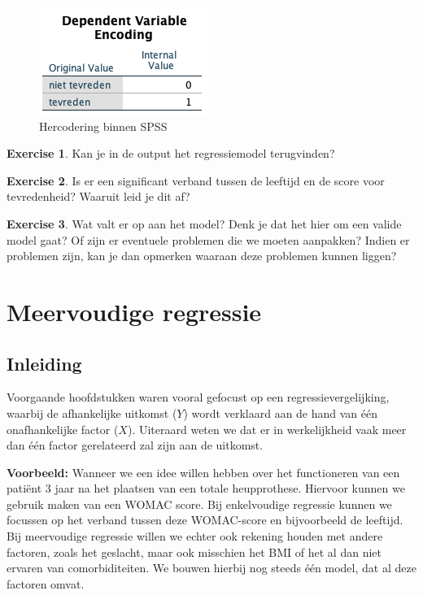 \documentclass[
]{book}
\theoremstyle{definition}
\theoremstyle{definition}
\theoremstyle{definition}
\newtheorem{exercise}{Exercise}[chapter]
\theoremstyle{definition}
\theoremstyle{remark}
\begin{document}
\begin{figure}
\includegraphics[width=0.4\linewidth]{img/ex_spss_log_4} \caption{Hercodering binnen SPSS}\label{fig:exspsslog4}
\end{figure}

\begin{exercise}
Kan je in de output het regressiemodel terugvinden?
\end{exercise}

\begin{exercise}
Is er een significant verband tussen de leeftijd en de score voor tevredenheid? Waaruit leid je dit af?
\end{exercise}

\begin{exercise}
Wat valt er op aan het model? Denk je dat het hier om een valide model gaat? Of zijn er eventuele problemen die we moeten aanpakken? Indien er problemen zijn, kan je dan opmerken waaraan deze problemen kunnen liggen?
\end{exercise}

\mainmatter

\hypertarget{multiregr}{%
\chapter{Meervoudige regressie}\label{multiregr}}

\hypertarget{inleiding-2}{%
\section*{Inleiding}\label{inleiding-2}}


Voorgaande hoofdstukken waren vooral gefocust op een regressievergelijking, waarbij de afhankelijke uitkomst (\(Y\)) wordt verklaard aan de hand van één onafhankelijke factor (\(X\)). Uiteraard weten we dat er in werkelijkheid vaak meer dan één factor gerelateerd zal zijn aan de uitkomst.

\textbf{Voorbeeld:} Wanneer we een idee willen hebben over het functioneren van een patiënt 3 jaar na het plaatsen van een totale heupprothese. Hiervoor kunnen we gebruik maken van een WOMAC score. Bij enkelvoudige regressie kunnen we focussen op het verband tussen deze WOMAC-score en bijvoorbeeld de leeftijd. Bij meervoudige regressie willen we echter ook rekening houden met andere factoren, zoals het geslacht, maar ook misschien het BMI of het al dan niet ervaren van comorbiditeiten. We bouwen hierbij nog steeds één model, dat al deze factoren omvat.
\end{document}
